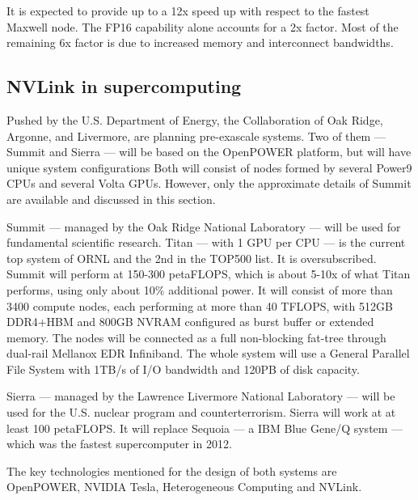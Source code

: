 It is expected to provide up to a 12x speed up with respect to the fastest Maxwell node.
The FP16 capability alone accounts for a 2x factor.
Most of the remaining 6x factor is due to increased memory and interconnect bandwidths.


\subsection{NVLink in supercomputing \cite{nvidia:summitsierrawhitepaper}} \label{subsec:nvlsupercomp}
Pushed by the U.S. Department of Energy, the Collaboration of Oak Ridge, Argonne, and Livermore, are planning pre-exascale systems.
Two of them --- Summit and Sierra --- will be based on the OpenPOWER platform, but will have unique system configurations
Both will consist of nodes formed by several Power9 CPUs and several Volta GPUs.
However, only the approximate details of Summit are available and discussed in this section.

Summit --- managed by the Oak Ridge National Laboratory --- will be used for fundamental scientific research.
Titan --- with 1 GPU per CPU --- is the current top system of ORNL and the 2nd in the TOP500 list.
It is oversubscribed.
Summit will perform at 150-300 petaFLOPS, which is about 5-10x of what Titan performs, using only about 10\% additional power.
It will consist of more than 3400 compute nodes, each performing at more than 40 TFLOPS, with 512GB DDR4+HBM and 800GB NVRAM configured as burst buffer or extended memory.
The nodes will be connected as a full non-blocking fat-tree through dual-rail Mellanox EDR Infiniband.
The whole system will use a General Parallel File System with 1TB/s of I/O bandwidth and 120PB of disk capacity.

Sierra --- managed by the Lawrence Livermore National Laboratory --- will be used for the U.S. nuclear program and counterterrorism.
Sierra will work at at least 100 petaFLOPS.
It will replace Sequoia --- a IBM Blue Gene/Q system --- which was the fastest supercomputer in 2012.

The key technologies mentioned for the design of both systems are OpenPOWER, NVIDIA Tesla, Heterogeneous Computing and NVLink.
%
%
%
%
%



